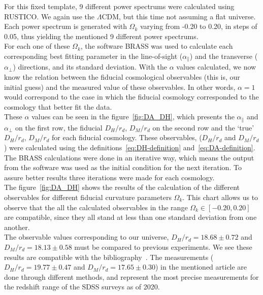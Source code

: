 For this fixed template, 9 different power spectrums were calculated using RUSTICO\@. We again use the $\Lambda$CDM, but this time not assuming a flat universe. Each power spectrum is generated with $\Omega_k$ varying from -0.20 to 0.20, in steps of 0.05, thus yielding the mentioned 9 different power spectrums. \\

For each one of these $\Omega_k$, the software BRASS was used to calculate each corresponding best fitting parameter in the line-of-sight ($\alpha_\parallel$) and the transverse ($\alpha_\perp$) directions, and its standard deviation. With the $\alpha$ values calculated, we now know the relation between the fiducial cosmological observables (this is, our initial guess) and the measured value of these observables. In other words, $\alpha=1$ would correspond to the case in which the fiducial cosmology corresponded to the cosmology that better fit the data.\\

These $\alpha$ values can be seen in the figure~\ref{fig:DA_DH}, which presents the $\alpha_\parallel$ and $\alpha_\perp$ on the first row, the fiducial $D_H / r_d$, $D_M/r_d $ on the second row and the `true' $D_H / r_d$, $D_M /r_d$ for each fiducial cosmology.  
These observables, ($D_H /r_d$ and $D_M /r_d $) were calculated using the definitions~\eqref{eq:DH-definition} and~\eqref{eq:DA-definition}. \\

The BRASS calculations were done in an iterative way, which means the output from the software was used as the initial condition for the next iteration. To assure better results three iterations were made for each cosmology.  \\

The figure~\ref{fig:DA_DH} shows the results of the calculation of the different observables for different fiducial curvature parameters $\Omega_k$. This chart allows us to observe that the all the calculated observables in the range $\Omega_k  \in \left[ -0.20, 0.20   \right] $ are compatible, since they all stand at less than one standard deviation from one another. \\

The observable values corresponding to our universe, $D_H/r_d = 18.68 \pm 0.72$ and $D_M/r_d = 18.13 \pm 0.58$ must be compared to previous experiments. We see these results are compatible with the bibliography~\cite{hector}. The measurements ($D_H/r_d = 19.77\pm0.47$ and $D_M/ r_d=17.65\pm 0.30$) in the mentioned article are done through different methods, and represent the most precise measurements for the redshift range of the SDSS surveys as of 2020.


